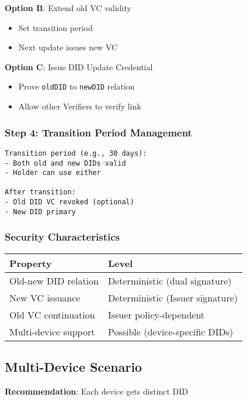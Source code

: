 \textbf{Option B}: Extend old VC validity
\begin{itemize}
  \item Set transition period
  \item Next update issues new VC
\end{itemize}

\textbf{Option C}: Issue DID Update Credential
\begin{itemize}
  \item Prove \texttt{oldDID} to \texttt{newDID} relation
  \item Allow other Verifiers to verify link
\end{itemize}

\subsubsection{Step 4: Transition Period Management}

\begin{verbatim}
Transition period (e.g., 30 days):
- Both old and new DIDs valid
- Holder can use either

After transition:
- Old DID VC revoked (optional)
- New DID primary
\end{verbatim}

\subsubsection{Security Characteristics}

\begin{table}[h]
\centering
\begin{tabular}{|l|l|}
\hline
\textbf{Property} & \textbf{Level} \\
\hline
Old-new DID relation & Deterministic (dual signature) \\
New VC issuance & Deterministic (Issuer signature) \\
Old VC continuation & Issuer policy-dependent \\
Multi-device support & Possible (device-specific DIDs) \\
\hline
\end{tabular}
\end{table}

\subsection{Multi-Device Scenario}

\textbf{Recommendation}: Each device gets distinct DID

